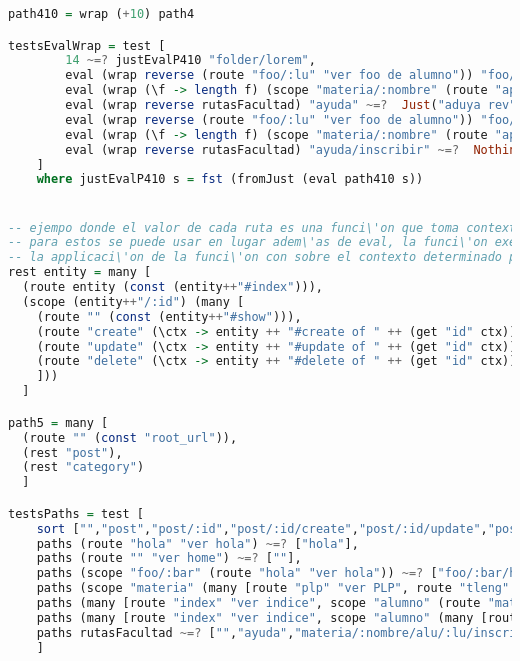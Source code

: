 \documentclass[10pt,a4paper]{article}
\begin{document}
\begin{lstlisting}[language=Haskell,breaklines=true,basicstyle=\tiny]
path410 = wrap (+10) path4

testsEvalWrap = test [
        14 ~=? justEvalP410 "folder/lorem",
        eval (wrap reverse (route "foo/:lu" "ver foo de alumno")) "foo/001" ~=? Just("onmula ed oof rev",[("lu","001")]),
        eval (wrap (\f -> length f) (scope "materia/:nombre" (route "aprobada?" "la materia se aprobo?"))) "materia/plp/aprobada?" ~=? Just(length "la materia se aprobo?",[("nombre","plp")]),
        eval (wrap reverse rutasFacultad) "ayuda" ~=?  Just("aduya rev",[]),
        eval (wrap reverse (route "foo/:lu" "ver foo de alumno")) "foo/lu/001" ~=? Nothing,
        eval (wrap (\f -> length f) (scope "materia/:nombre" (route "aprobada?" "la materia se aprobo?"))) "materia/plp/aprobada" ~=? Nothing,
        eval (wrap reverse rutasFacultad) "ayuda/inscribir" ~=?  Nothing
    ]
    where justEvalP410 s = fst (fromJust (eval path410 s))


-- ejempo donde el valor de cada ruta es una funci\'on que toma context como entrada.
-- para estos se puede usar en lugar adem\'as de eval, la funci\'on exec para devolver
-- la applicaci\'on de la funci\'on con sobre el contexto determinado por la ruta
rest entity = many [
  (route entity (const (entity++"#index"))),
  (scope (entity++"/:id") (many [
    (route "" (const (entity++"#show"))),
    (route "create" (\ctx -> entity ++ "#create of " ++ (get "id" ctx))),
    (route "update" (\ctx -> entity ++ "#update of " ++ (get "id" ctx))),
    (route "delete" (\ctx -> entity ++ "#delete of " ++ (get "id" ctx)))
    ]))
  ]

path5 = many [
  (route "" (const "root_url")),
  (rest "post"),
  (rest "category")
  ]

testsPaths = test [
    sort ["","post","post/:id","post/:id/create","post/:id/update","post/:id/delete","category","category/:id","category/:id/create","category/:id/update","category/:id/delete"] ~=? sort (paths path5),
    paths (route "hola" "ver hola") ~=? ["hola"],
    paths (route "" "ver home") ~=? [""],
    paths (scope "foo/:bar" (route "hola" "ver hola")) ~=? ["foo/:bar/hola"],
    paths (scope "materia" (many [route "plp" "ver PLP", route "tleng" "ver TLeng", route "bbdd" "ver BBDD"])) ~=? ["materia/plp","materia/tleng","materia/bbdd"],
    paths (many [route "index" "ver indice", scope "alumno" (route "materia/:nombre" "ver materia")]) ~=? ["index","alumno/materia/:nombre"],
    paths (many [route "index" "ver indice", scope "alumno" (many [route "foo" "ver foo", route ":lu/bar" "ver bar"])]) ~=? ["index","alumno/foo","alumno/:lu/bar"],
    paths rutasFacultad ~=? ["","ayuda","materia/:nombre/alu/:lu/inscribir","materia/:nombre/alu/:lu/aprobar","alu/:lu/aprobadas"]
    ]



\end{lstlisting}
\end{document}
